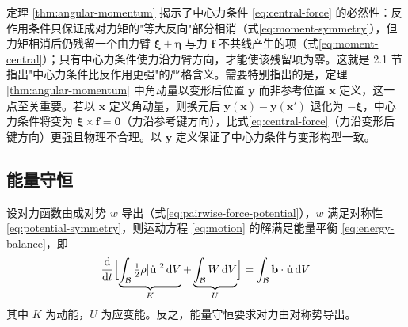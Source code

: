 定理 \ref{thm:angular-momentum} 揭示了中心力条件 \eqref{eq:central-force} 的必然性：反作用条件只保证成对力矩的"等大反向"部分相消（式\eqref{eq:moment-symmetry}），但力矩相消后仍残留一个由力臂 $\boldsymbol{\xi}+\boldsymbol{\eta}$ 与力 $\mathbf{f}$ 不共线产生的项（式\eqref{eq:moment-central}）；只有中心力条件使力沿力臂方向，才能使该残留项为零。这就是 2.1 节指出"中心力条件比反作用更强"的严格含义。需要特别指出的是，定理 \ref{thm:angular-momentum} 中角动量以变形后位置 $\mathbf{y}$ 而非参考位置 $\mathbf{x}$ 定义，这一点至关重要。若以 $\mathbf{x}$ 定义角动量，则换元后 $\mathbf{y}(\mathbf{x})-\mathbf{y}(\mathbf{x}')$ 退化为 $-\boldsymbol{\xi}$，中心力条件将变为 $\boldsymbol{\xi}\times\mathbf{f}=\mathbf{0}$（力沿参考键方向），比式\eqref{eq:central-force}（力沿变形后键方向）更强且物理不合理。以 $\mathbf{y}$ 定义保证了中心力条件与变形构型一致。

\subsection{能量守恒}

\begin{theorem}[能量守恒]
  设对力函数由成对势 $w$ 导出（式\eqref{eq:pairwise-force-potential}），$w$ 满足对称性 \eqref{eq:potential-symmetry}，则运动方程 \eqref{eq:motion} 的解满足能量平衡 \eqref{eq:energy-balance}，即
  \begin{equation}
    \frac{\mathrm{d}}{\mathrm{d}t}\Bigl[\underbrace{\int_{\mathcal{B}}\tfrac{1}{2}\rho|\dot{\mathbf{u}}|^{2}\,\mathrm{d}V}_{K}+\underbrace{\int_{\mathcal{B}}W\,\mathrm{d}V}_{U}\Bigr]=\int_{\mathcal{B}}\mathbf{b}\cdot\dot{\mathbf{u}}\,\mathrm{d}V
    \label{eq:energy-theorem}
  \end{equation}
  其中 $K$ 为动能，$U$ 为应变能。反之，能量守恒要求对力由对称势导出。
  \label{thm:energy}
\end{theorem}

